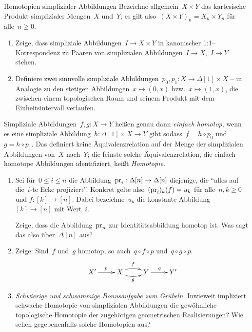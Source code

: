 \documentclass{uebblatt}
\begin{document}
\begin{aufgabe}{Homotopien simplizialer Abbildungen}
Bezeichne allgemein~$X \times Y$ das kartesische Produkt simplizialer
Mengen~$X$ und~$Y$; es gilt also~$(X \times Y)_n = X_n \times Y_n$ für alle~$n
\geq 0$.

\begin{enumerate}
\item Zeige, dass simpliziale Abbildungen~$I \to X \times Y$ in kanonischer
1:1--Korrespondenz zu Paaren von simplizialen Abbildungen~$I \to X$,~$I \to Y$
stehen.
\item Definiere zwei sinnvolle simpliziale Abbildungen~$p_0, p_1 : X \to
\Delta[1] \times X$ -- in Analogie zu den stetigen Abbildungen~$x \mapsto
(0,x)$ bzw.~$x \mapsto (1,x)$, die zwischen einem topologischen Raum und seinem
Produkt mit dem Einheitsintervall verlaufen.
\end{enumerate}
Simpliziale Abbildungen~$f,g : X \to Y$ heißen genau dann \emph{einfach
homotop}, wenn es eine simpliziale Abbildung~$h : \Delta[1] \times X \to Y$
gibt sodass~$f = h \circ p_0$ und~$g = h \circ p_1$. Das definiert keine
Äquivalenzrelation auf der Menge der simplizialen Abbildungen von~$X$ nach~$Y$;
die feinste solche Äquivalenzrelation, die einfach homotope Abbildungen
identifiziert, heißt \emph{Homotopie}.
\begin{enumerate}
\addtocounter{enumi}{2}
\item Sei für~$0 \leq i \leq n$ die Abbildung~$\mathrm{pr}_i : \Delta[n] \to \Delta[n]$
diejenige, die ``alles auf die~$i$-te Ecke projiziert''. Konkret gelte
also~$(\mathrm{pr}_i)_k(f) = u_k$ für alle~$n,k \geq 0$ und $f : [k] \to [n]$. Dabei
bezeichne~$u_k$ die konstante Abbildung~$[k] \to [n]$ mit Wert~$i$.

Zeige, dass die Abbildung~$\mathrm{pr}_n$ zur Identitätsabbildung homotop ist. Was sagt
das also über~$\Delta[n]$ aus?

\item Zeige: Sind~$f$ und~$g$ homotop, so
auch~$q \circ f \circ p$ und~$q \circ g \circ p$.
\[ \xymatrix{
  X' \ar[r]^p & X \ar@/^/[r]^f \ar@/_/[r]_g & Y \ar[r]^q & Y'
} \]

\item \emph{Schwierige und schwammige Bonusaufgabe zum Grübeln.} Inwieweit
impliziert schwache Homotopie von simplizialen Abbildungen die gewöhnliche
topologische Homotopie der zugehörigen geometrischen Realisierungen? Wie sehen
gegebenenfalls solche Homotopien aus?
\end{enumerate}
\end{aufgabe}
\end{document}
